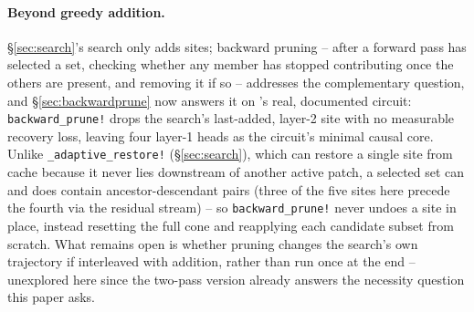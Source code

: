 \documentclass{article}
\begin{document}
\paragraph{Beyond greedy addition.} \S\ref{sec:search}'s search only adds sites; backward pruning
-- after a forward pass has selected a set, checking whether any member has stopped contributing
once the others are present, and removing it if so -- addresses the complementary question, and
\S\ref{sec:backwardprune} now answers it on 's real, documented circuit:
\texttt{backward\_prune!} drops the search's last-added, layer-2 site with no measurable recovery
loss, leaving four layer-1 heads as the circuit's minimal causal core. Unlike
\texttt{\_adaptive\_restore!} (\S\ref{sec:search}), which can restore a single site from cache
because it never lies downstream of another active patch, a selected set can and does contain
ancestor-descendant pairs (three of the five sites here precede the fourth via the residual
stream) -- so \texttt{backward\_prune!} never undoes a site in place, instead resetting the full
cone and reapplying each candidate subset from scratch. What remains open is whether pruning
changes the search's own trajectory if interleaved with addition, rather than run once at the
end -- unexplored here since the two-pass version already answers the necessity question this
paper asks.
\end{document}
